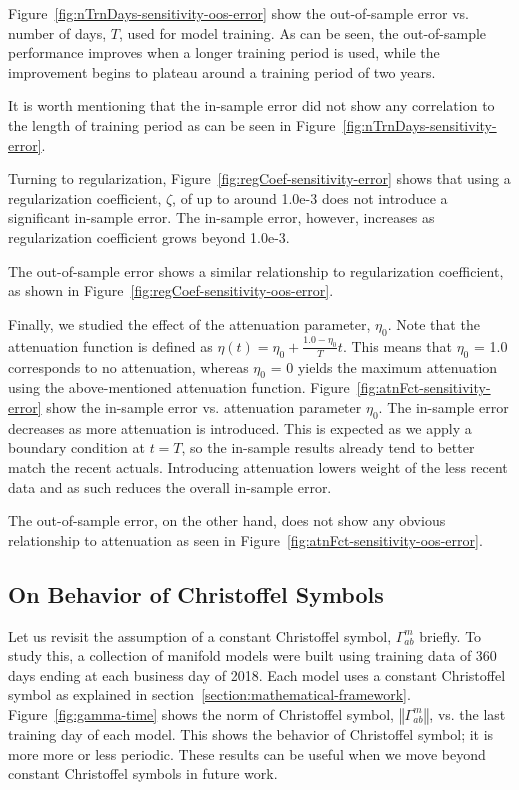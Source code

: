 \documentclass{article}
\begin{document}
Figure~\ref{fig:nTrnDays-sensitivity-oos-error} show the out-of-sample
error vs. number of days, $T$, used for model training. As can be
seen, the out-of-sample performance improves when a longer training
period is used, while the improvement begins to plateau around a
training period of two years. 

It is worth mentioning that the in-sample error did not show any
correlation to the length of training period as can be seen in
Figure~\ref{fig:nTrnDays-sensitivity-error}.

Turning to regularization, Figure~\ref{fig:regCoef-sensitivity-error}
shows that using a regularization coefficient, $\zeta$, of up to
around 1.0e-3 does not introduce a significant in-sample error. The
in-sample error, however, increases as regularization coefficient
grows beyond 1.0e-3.

The out-of-sample error shows a similar relationship to regularization
coefficient, as shown in
Figure~\ref{fig:regCoef-sensitivity-oos-error}.

Finally, we studied the effect of the attenuation parameter,
$\eta_{0}$. Note that the attenuation function is defined as
$\eta(t) = \eta_{0} + \frac{1.0 - \eta_{0}}{T} t$. This means that
$\eta_{0}$ = 1.0 corresponds to no attenuation, whereas $\eta_{0}$ = 0
yields the maximum attenuation using the above-mentioned attenuation
function. Figure~\ref{fig:atnFct-sensitivity-error} show the in-sample
error vs. attenuation parameter $\eta_{0}$. The in-sample error
decreases as more attenuation is introduced. This is expected as we
apply a boundary condition at $t = T$, so the in-sample results
already tend to better match the recent actuals. Introducing
attenuation lowers weight of the less recent data and as such reduces
the overall in-sample error.

The out-of-sample error, on the other hand, does not show any obvious
relationship to attenuation as seen in
Figure~\ref{fig:atnFct-sensitivity-oos-error}.

\subsection{On Behavior of Christoffel Symbols}\label{subsection:christoffel-behavior}

Let us revisit the assumption of a constant Christoffel symbol,
$\Gamma^{m}_{ab}$ briefly. To study this, a collection of manifold
models were built using training data of 360 days ending at each
business day of 2018. Each model uses a constant Christoffel symbol as
explained in
section~\ref{section:mathematical-framework}. Figure~\ref{fig:gamma-time}
shows the norm of Christoffel symbol, $\left\Vert \Gamma^{m}_{ab}
\right\Vert$, vs. the last training day of each model. This shows the
behavior of Christoffel symbol; it is more more or less
periodic. These results can be useful when we move beyond constant
Christoffel symbols in future work.
\end{document}
